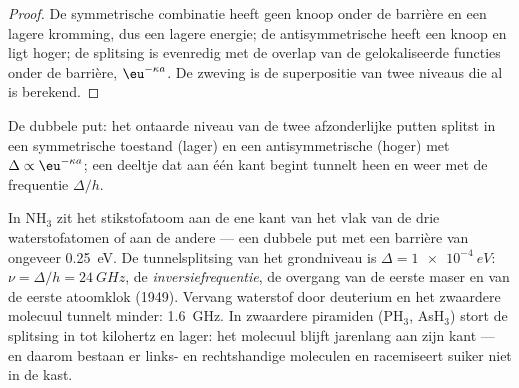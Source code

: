 \begin{proof}
De symmetrische combinatie heeft geen knoop onder de barrière en een lagere
kromming, dus een lagere energie; de antisymmetrische heeft een knoop en
ligt hoger; de splitsing is evenredig met de overlap van de
gelokaliseerde functies onder de barrière, $\eu^{-\kappa a}$. De zweving is
de superpositie van twee niveaus die al is berekend.
\end{proof}

\begin{omfigure}

{\small De dubbele put: het ontaarde niveau van de twee afzonderlijke
putten splitst in een symmetrische toestand (lager) en een antisymmetrische
(hoger) met $\Delta \propto \eu^{-\kappa a}$; een deeltje dat aan één kant begint
tunnelt heen en weer met de frequentie $\Delta/h$.}
\end{omfigure}

\begin{example}[Ammoniak]\label{ex:b2:potential-wells-tunneling:ammonia}
In NH$_3$ zit het stikstofatoom aan de ene kant van het vlak van de drie
waterstofatomen of aan de andere --- een dubbele put met een barrière van ongeveer
\qty{0.25}{eV}. De tunnelsplitsing van het grondniveau is
$\Delta =
\qty{1e-4}{eV}$: $\nu = \Delta/h = \qty{24}{GHz}$, de
\emph{inversiefrequentie},
de overgang van de eerste maser en van de eerste atoomklok
(1949). Vervang waterstof door deuterium en het zwaardere molecuul
tunnelt minder: \qty{1.6}{GHz}. In zwaardere piramiden (PH$_3$, AsH$_3$) stort de
splitsing in tot kilohertz en lager: het molecuul blijft jarenlang aan zijn
kant --- en daarom bestaan er links- en rechtshandige moleculen
en racemiseert suiker niet in de kast.
\end{example}

